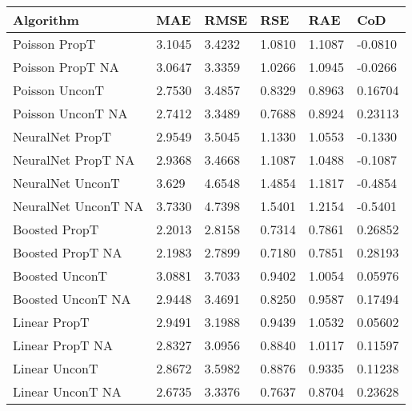 \begin{table}[htb]
    \begin{tabularx}{\textwidth}{|Y|L{0.08\textwidth}|L{0.10\textwidth}|L{0.08\textwidth}|L{0.08\textwidth}|L{0.1\textwidth}|}
        \hline
        \textbf{Algorithm} &
        \textbf{MAE} &
        \textbf{RMSE} &
        \textbf{RSE} &
        \textbf{RAE} &
        \textbf{CoD} \\ \hline
        Poisson PropT				& 3.1045				& 3.4232				& 1.0810				& 1.1087				& -0.0810  \\
        Poisson PropT NA 			& 3.0647			 	& 3.3359				& 1.0266			 	& 1.0945				& -0.0266  \\
        \hline
        Poisson UnconT				& 2.7530				& 3.4857			 	& 0.8329				& 0.8963			 	& 0.16704  \\
        Poisson UnconT NA 			& 2.7412				& 3.3489			 	& 0.7688				& 0.8924			 	& 0.23113  \\
        \hline
        NeuralNet PropT				& 2.9549				& 3.5045				& 1.1330				& 1.0553				& -0.1330  \\
        NeuralNet PropT NA			& 2.9368				& 3.4668				& 1.1087				& 1.0488				& -0.1087  \\
        \hline
        NeuralNet UnconT			& 3.629					& 4.6548			 	& 1.4854				& 1.1817			 	& -0.4854  \\
        NeuralNet UnconT NA 		& 3.7330				& 4.7398			 	& 1.5401				& 1.2154			 	& -0.5401  \\
        \hline
        Boosted PropT				& 2.2013				& 2.8158			 	& 0.7314				& 0.7861				& 0.26852  \\
        Boosted PropT NA			& 2.1983				& 2.7899				& 0.7180				& 0.7851				& 0.28193  \\
        \hline
        Boosted UnconT				& 3.0881				& 3.7033			 	& 0.9402				& 1.0054			 	& 0.05976  \\
        Boosted UnconT NA 			& 2.9448				& 3.4691			 	& 0.8250				& 0.9587			 	& 0.17494  \\
        \hline
        Linear PropT				& 2.9491				& 3.1988				& 0.9439				& 1.0532				& 0.05602  \\
        Linear PropT NA				& 2.8327			 	& 3.0956				& 0.8840			 	& 1.0117			 	& 0.11597  \\
        \hline
        Linear UnconT				& 2.8672				& 3.5982			 	& 0.8876				& 0.9335			 	& 0.11238  \\
        Linear UnconT NA 			& 2.6735				& 3.3376			 	& 0.7637				& 0.8704			 	& 0.23628  \\

\end{tabularx}
\end{table}
